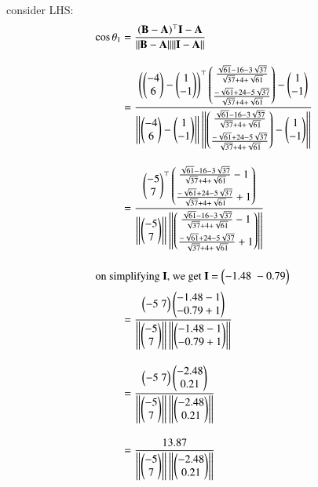 \documentclass[journal,12pt,twocolumn]{IEEEtran}
\theoremstyle{remark}
\begin{document}
consider LHS:
\begin{align} 
\cos{\theta_1} &= \frac{(\mathbf{B} - \mathbf{A})^{\top}\mathbf{I} - \mathbf{A}}{||\mathbf{B} - \mathbf{A}|| || \mathbf{I} - \mathbf{A}||}\\[10pt]
 &= \frac{\left(\begin{pmatrix}-4\\6\end{pmatrix} - \begin{pmatrix}1\\-1\end{pmatrix}\right)^{\top}\begin{pmatrix}\frac{{\sqrt{61}-16-3\sqrt{37}}}{\sqrt{37}+4+\sqrt{61}}\\[6pt]\frac{{-\sqrt{61}+24-5\sqrt{37}}}{\sqrt{37}+4+\sqrt{61}}\end{pmatrix} - \begin{pmatrix}1\\-1\end{pmatrix}}{\left|\left|\begin{pmatrix}-4\\6\end{pmatrix} - \begin{pmatrix}1\\-1\end{pmatrix}\right|\right| \left|\left| \begin{pmatrix}\frac{{\sqrt{61}-16-3\sqrt{37}}}{\sqrt{37}+4+\sqrt{61}}\\[6pt]\frac{{-\sqrt{61}+24-5\sqrt{37}}}{\sqrt{37}+4+\sqrt{61}}\end{pmatrix} - \begin{pmatrix}1\\-1\end{pmatrix}\right|\right|}\\[10pt]
 &= \frac{\begin{pmatrix}-5\\7\end{pmatrix}^{\top}\begin{pmatrix}\frac{{\sqrt{61}-16-3\sqrt{37}}}{\sqrt{37}+4+\sqrt{61}}-1\\[6pt]\frac{{-\sqrt{61}+24-5\sqrt{37}}}{\sqrt{37}+4+\sqrt{61}}+1\end{pmatrix}}{\left|\left|\begin{pmatrix}-5\\7\end{pmatrix}\right|\right| \left|\left| \begin{pmatrix}\frac{{\sqrt{61}-16-3\sqrt{37}}}{\sqrt{37}+4+\sqrt{61}}-1\\[6pt]\frac{{-\sqrt{61}+24-5\sqrt{37}}}{\sqrt{37}+4+\sqrt{61}}+1\end{pmatrix}\right|\right|}\\[10pt]
\intertext{on simplifying $\mathbf{I}$, we get $\mathbf{I}$ = \ensuremath{\begin{pmatrix}-1.48\;-0.79\end{pmatrix}}}
&= \frac{\begin{pmatrix}-5\;7\end{pmatrix}\begin{pmatrix}-1.48-1\\-0.79+1\end{pmatrix}}{\left|\left|\begin{pmatrix}-5\\7\end{pmatrix}\right|\right| \left|\left| \begin{pmatrix}-1.48-1\\-0.79+1\end{pmatrix}\right|\right|}\\[10pt]
&= \frac{\begin{pmatrix}-5\;7\end{pmatrix}\begin{pmatrix}-2.48\\0.21\end{pmatrix}}{\left|\left|\begin{pmatrix}-5\\7\end{pmatrix}\right|\right| \left|\left| \begin{pmatrix}-2.48\\0.21\end{pmatrix}\right|\right|}\\[10pt]
&= \frac{13.87}{\left|\left|\begin{pmatrix}-5\\7\end{pmatrix}\right|\right| \left|\left| \begin{pmatrix}-2.48\\0.21\end{pmatrix}\right|\right|}\\[10pt]
\end{align}
\end{document}

